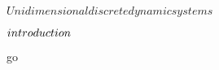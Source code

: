 \unit{ $ Unidimensional discrete dynamic systems $ }
{
	\introduction
	{ 
		$introduction\\$ 
	}

	go

}